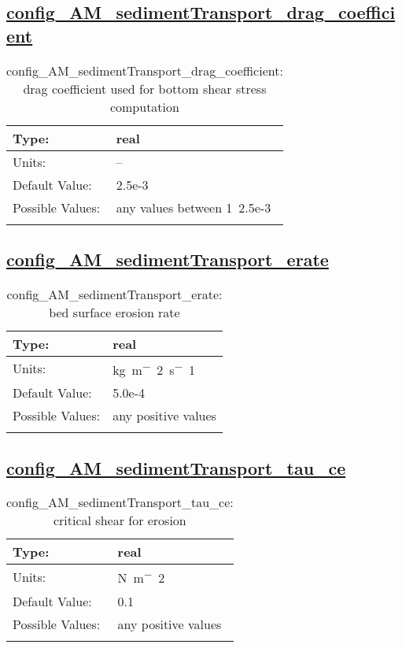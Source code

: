 \subsection[config\_AM\_sedimentTransport\_drag\_coefficient]{\hyperref[sec:nm_tab_AM_sedimentTransport]{config\_AM\_sedimentTransport\_drag\_coefficient}}
\label{subsec:nm_sec_config_AM_sedimentTransport_drag_coefficient}
\begin{center}
\begin{longtable}{| p{2.0in} || p{4.0in} |}
    \hline
    Type: & real \\
    \hline
    Units: & -- \\
    \hline
    Default Value: & 2.5e-3 \\
    \hline
    Possible Values: & any values between 1~2.5e-3 \\
    \hline
    \caption{config\_AM\_sedimentTransport\_drag\_coefficient: drag coefficient used for bottom shear stress computation}
\end{longtable}
\end{center}
\subsection[config\_AM\_sedimentTransport\_erate]{\hyperref[sec:nm_tab_AM_sedimentTransport]{config\_AM\_sedimentTransport\_erate}}
\label{subsec:nm_sec_config_AM_sedimentTransport_erate}
\begin{center}
\begin{longtable}{| p{2.0in} || p{4.0in} |}
    \hline
    Type: & real \\
    \hline
    Units: & \si{kg.m^-2.s^-1} \\
    \hline
    Default Value: & 5.0e-4 \\
    \hline
    Possible Values: & any positive values \\
    \hline
    \caption{config\_AM\_sedimentTransport\_erate: bed surface erosion rate}
\end{longtable}
\end{center}
\subsection[config\_AM\_sedimentTransport\_tau\_ce]{\hyperref[sec:nm_tab_AM_sedimentTransport]{config\_AM\_sedimentTransport\_tau\_ce}}
\label{subsec:nm_sec_config_AM_sedimentTransport_tau_ce}
\begin{center}
\begin{longtable}{| p{2.0in} || p{4.0in} |}
    \hline
    Type: & real \\
    \hline
    Units: & \si{N.m^-2} \\
    \hline
    Default Value: & 0.1 \\
    \hline
    Possible Values: & any positive values \\
    \hline
    \caption{config\_AM\_sedimentTransport\_tau\_ce: critical shear for erosion}
\end{longtable}
\end{center}
